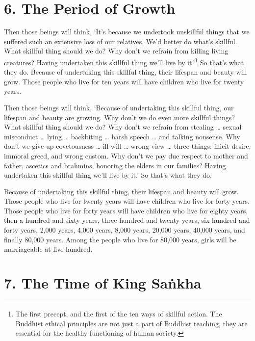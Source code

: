 \documentclass[12pt,openany]{book}%
\begin{document}
\section*{6. The Period of Growth }

Then those beings will think, ‘It’s because we undertook unskillful things that we suffered such an extensive loss of our relatives. We’d better do what’s skillful. What skillful thing should we do? Why don’t we refrain from killing living creatures? Having undertaken this skillful thing we’ll live by it.’\footnote{The first precept, and the first of the ten ways of skillful action. The Buddhist ethical principles are not just a part of Buddhist teaching, they are essential for the healthy functioning of human society. } So that’s what they do. Because of undertaking this skillful thing, their lifespan and beauty will grow. Those people who live for ten years will have children who live for twenty years. 

Then those beings will think, ‘Because of undertaking this skillful thing, our lifespan and beauty are growing. Why don’t we do even more skillful things? What skillful thing should we do? Why don’t we refrain from stealing … sexual misconduct … lying … backbiting … harsh speech … and talking nonsense. Why don’t we give up covetousness … ill will … wrong view … three things: illicit desire, immoral greed, and wrong custom. Why don’t we pay due respect to mother and father, ascetics and brahmins, honoring the elders in our families? Having undertaken this skillful thing we’ll live by it.’ So that’s what they do. 

Because of undertaking this skillful thing, their lifespan and beauty will grow. Those people who live for twenty years will have children who live for forty years. Those people who live for forty years will have children who live for eighty years, then a hundred and sixty years, three hundred and twenty years, six hundred and forty years, 2,000 years, 4,000 years, 8,000 years, 20,000 years, 40,000 years, and finally 80,000 years. Among the people who live for 80,000 years, girls will be marriageable at five hundred. 

\section*{7. The Time of King \textsanskrit{Saṅkha} }
\end{document}
